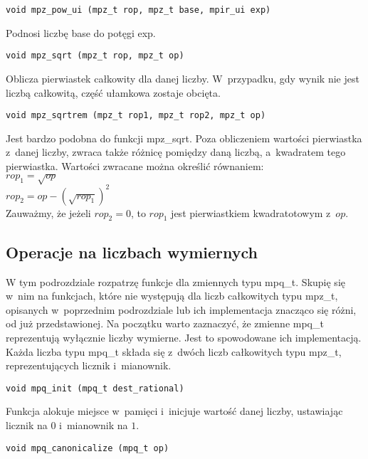 \begin{lstlisting}
void mpz_pow_ui (mpz_t rop, mpz_t base, mpir_ui exp)
\end{lstlisting}

Podnosi liczbę base do potęgi exp.

\begin{lstlisting}
void mpz_sqrt (mpz_t rop, mpz_t op)
\end{lstlisting}

Oblicza pierwiastek całkowity dla danej liczby. W~przypadku, gdy wynik nie jest liczbą całkowitą, część ułamkowa zostaje obcięta.

\begin{lstlisting}
void mpz_sqrtrem (mpz_t rop1, mpz_t rop2, mpz_t op)
\end{lstlisting}

Jest bardzo podobna do funkcji mpz\_sqrt. Poza obliczeniem wartości pierwiastka z~danej liczby, zwraca także różnicę pomiędzy daną liczbą, a~kwadratem tego pierwiastka. Wartości zwracane można określić równaniem: \\
$rop_1 = \sqrt{op}$ \\
$rop_2 = op - (\sqrt{rop_1})^2$ \\
Zauważmy, że jeżeli $rop_2=0$, to $rop_1$ jest pierwiastkiem kwadratotowym z~$op$.

\subsection{Operacje na liczbach wymiernych}

W tym podrozdziale rozpatrzę funkcje dla zmiennych typu mpq\_t. Skupię się w~nim na funkcjach, które nie występują dla liczb całkowitych typu mpz\_t, opisanych w~poprzednim podrozdziale lub ich implementacja znacząco się różni, od już przedstawionej.
Na początku warto zaznaczyć, że zmienne mpq\_t reprezentują wyłącznie liczby wymierne. Jest to spowodowane ich implementacją. Każda liczba typu mpq\_t składa się z~dwóch liczb całkowitych typu mpz\_t, reprezentujących licznik i~mianownik.

\begin{lstlisting}
void mpq_init (mpq_t dest_rational)
\end{lstlisting}

Funkcja alokuje miejsce w~pamięci i~inicjuje wartość danej liczby, ustawiając licznik na $0$ i~mianownik na $1$.

\begin{lstlisting}
void mpq_canonicalize (mpq_t op)
\end{lstlisting}

